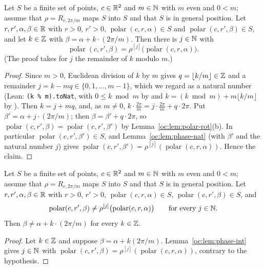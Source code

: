 \begin{lemma}\label{oc:lem:phase-int}
Let $S$ be a finite set of points, $c\in\mathbb R^2$ and $m\in\mathbb N$ with $m$ even and $0<m$; assume that
$\rho=R_{c,2\pi/m}$ maps $S$ into $S$ and that $S$ is in general position. Let $r,r',\alpha,\beta\in\mathbb R$
with $r>0$, $r'>0$, $\operatorname{polar}(c,r,\alpha)\in S$ and $\operatorname{polar}(c,r',\beta)\in S$,
and let $k\in\mathbb Z$ with $\beta=\alpha+k\cdot(2\pi/m)$. Then there is $j\in\mathbb N$ with
\[\operatorname{polar}(c,r',\beta)=\rho^{[j]}\bigl(\operatorname{polar}(c,r,\alpha)\bigr).\]
(The proof takes for $j$ the remainder of $k$ modulo $m$.)
\end{lemma}
\begin{proof}
Since $m>0$, Euclidean division of $k$ by $m$ gives $q=\lfloor k/m\rfloor\in\mathbb Z$ and a remainder
$j=k-mq\in\{0,1,\dots,m-1\}$, which we regard as a natural number (Lean: \texttt{(k \% m).toNat}, with
$0\le k\bmod m$ by  and $k=(k\bmod m)+m\lfloor k/m\rfloor$ by
). Then $k=j+mq$, and, as $m\ne0$,
$k\cdot\frac{2\pi}{m}=j\cdot\frac{2\pi}{m}+q\cdot2\pi$. Put $\beta'=\alpha+j\cdot(2\pi/m)$; then
$\beta=\beta'+q\cdot2\pi$, so $\operatorname{polar}(c,r',\beta)=\operatorname{polar}(c,r',\beta')$ by
Lemma~\ref{oc:lem:polar-rot}(b). In particular $\operatorname{polar}(c,r',\beta')\in S$, and
Lemma~\ref{oc:lem:phase-nat} (with $\beta'$ and the natural number $j$) gives
$\operatorname{polar}(c,r',\beta')=\rho^{[j]}(\operatorname{polar}(c,r,\alpha))$. Hence the claim.
\end{proof}

\begin{theorem}\label{oc:thm:phase-orbit}
Let $S$ be a finite set of points, $c\in\mathbb R^2$ and $m\in\mathbb N$ with $m$ even and $0<m$; assume that
$\rho=R_{c,2\pi/m}$ maps $S$ into $S$ and that $S$ is in general position. Let $r,r',\alpha,\beta\in\mathbb R$
with $r>0$, $r'>0$, $\operatorname{polar}(c,r,\alpha)\in S$, $\operatorname{polar}(c,r',\beta)\in S$, and
\[\operatorname{polar}(c,r',\beta)\ne\rho^{[j]}\bigl(\operatorname{polar}(c,r,\alpha)\bigr)\qquad\text{for
every } j\in\mathbb N .\]
Then $\beta\ne\alpha+k\cdot(2\pi/m)$ for every $k\in\mathbb Z$.
\end{theorem}
\begin{proof}
Let $k\in\mathbb Z$ and suppose $\beta=\alpha+k(2\pi/m)$. Lemma~\ref{oc:lem:phase-int} gives $j\in\mathbb N$ with
$\operatorname{polar}(c,r',\beta)=\rho^{[j]}(\operatorname{polar}(c,r,\alpha))$, contrary to the
hypothesis.
\end{proof}

